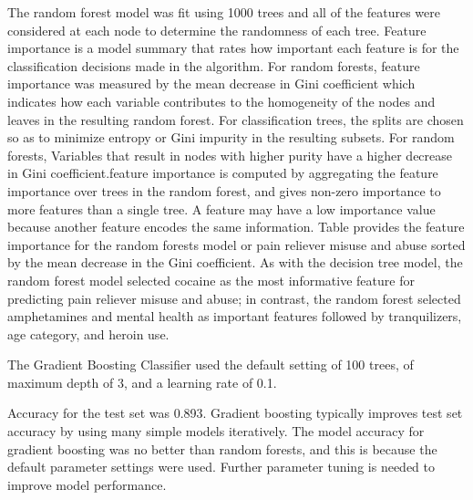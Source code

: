 \documentclass[sigconf]{acmart}
\begin{document}
The random forest model was fit using 1000 trees and all of the features 
were considered at each node to determine the randomness of each tree.
Feature importance is a model summary that rates how important each feature is 
for the classification decisions made in the algorithm. For random forests, 
feature importance was measured by the mean decrease in Gini coefficient 
which indicates how each variable contributes to the homogeneity of the nodes 
and leaves in the resulting random forest. For classification trees, the splits 
are chosen so as to minimize entropy or Gini impurity in the resulting subsets.
For random forests, Variables that result in nodes with higher purity have a 
higher decrease in Gini coefficient.feature importance is computed by 
aggregating the feature importance over trees in the random forest, and gives 
non-zero importance to more features than a single tree.  A feature may have 
a low importance value because another feature encodes the same information. 
Table  provides the feature importance for the random forests model or pain 
reliever misuse and abuse sorted by the mean decrease in the Gini coefficient. 
As with the decision tree model, the random forest model selected cocaine as
the most informative feature for predicting pain reliever misuse and abuse; 
in contrast, the random forest selected amphetamines and mental health as
important features followed by tranquilizers, age category, and heroin use. 

The Gradient Boosting Classifier used the default setting of 100 trees, of 
maximum depth of 3, and a learning rate of 0.1. 

Accuracy for the test set was 0.893. Gradient boosting typically improves test 
set accuracy by using many simple models iteratively. The model accuracy for 
gradient boosting was no better than random forests, and this is because the 
default parameter settings were used. Further parameter tuning is needed 
to improve model performance.

\end{document}
